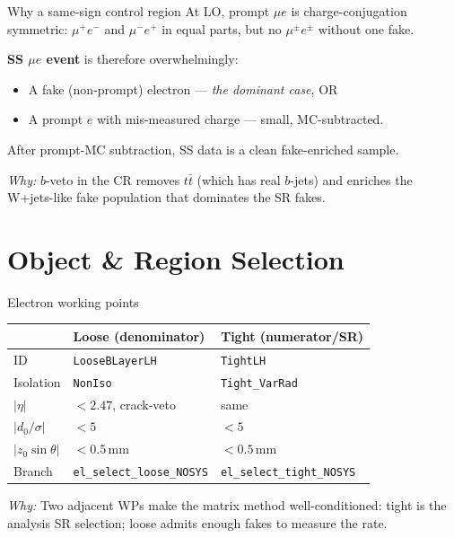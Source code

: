 \documentclass[10pt,aspectratio=169]{beamer}
\newcommand{\motiv}[1]{%
  \begin{tcolorbox}[colback=motivbg,colframe=motivbord,arc=1.5mm,boxrule=0.5pt,
                    left=1mm,right=1mm,top=0.5mm,bottom=0.5mm]
  \footnotesize\textit{Why:} #1
  \end{tcolorbox}}
\newcommand{\fname}[1]{\texttt{\tiny #1}}
\begin{document}
\begin{frame}{Why a same-sign control region}
  \footnotesize
  At LO, prompt $\mu e$ is charge-conjugation symmetric: $\mu^+ e^-$ and $\mu^- e^+$
  in equal parts, but no $\mu^\pm e^\pm$ without one fake.

  \vspace{1mm}
  \textbf{SS $\mu e$ event} is therefore overwhelmingly:
  \begin{itemize}\setlength{\itemsep}{0pt}
    \item A fake (non-prompt) electron — \emph{the dominant case}, OR
    \item A prompt $e$ with mis-measured charge — small, MC-subtracted.
  \end{itemize}

  After prompt-MC subtraction, SS data is a clean fake-enriched sample.

  \motiv{$b$-veto in the CR removes $t\bar t$ (which has real $b$-jets) and
  enriches the W+jets-like fake population that dominates the SR fakes.}
\end{frame}

\section{Object \& Region Selection}

\begin{frame}{Electron working points}
  \scriptsize
  \begin{tabular}{lll}
    \toprule
    & Loose (denominator) & Tight (numerator/SR) \\
    \midrule
    ID                 & \texttt{LooseBLayerLH}      & \texttt{TightLH} \\
    Isolation          & \texttt{NonIso}             & \texttt{Tight\_VarRad} \\
    $|\eta|$           & $<2.47$, crack-veto         & same \\
    $|d_0/\sigma|$     & $<5$                        & $<5$ \\
    $|z_0\sin\theta|$  & $<0.5$\,mm                  & $<0.5$\,mm \\
    Branch             & \fname{el\_select\_loose\_NOSYS}
                       & \fname{el\_select\_tight\_NOSYS} \\
    \bottomrule
  \end{tabular}
  \motiv{Two adjacent WPs make the matrix method well-conditioned: tight is
  the analysis SR selection; loose admits enough fakes to measure the rate.}
\end{frame}
\end{document}
